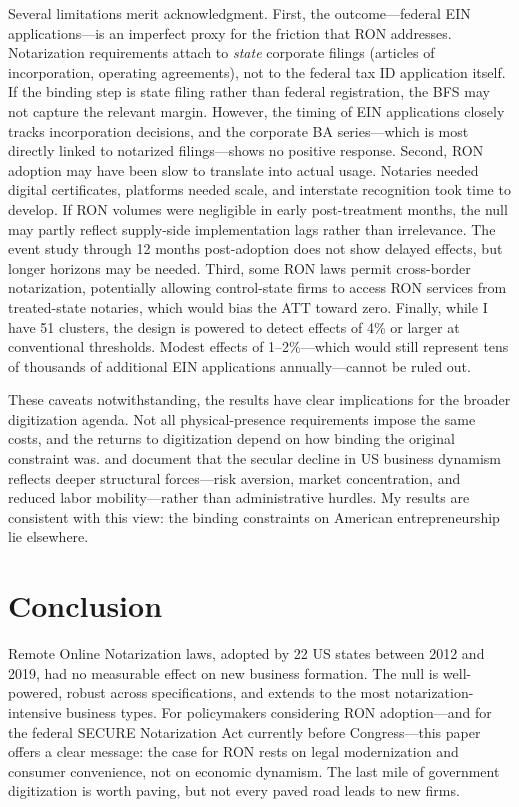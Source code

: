 \documentclass[12pt]{article}
\begin{document}
Several limitations merit acknowledgment. First, the outcome---federal EIN applications---is an imperfect proxy for the friction that RON addresses. Notarization requirements attach to \textit{state} corporate filings (articles of incorporation, operating agreements), not to the federal tax ID application itself. If the binding step is state filing rather than federal registration, the BFS may not capture the relevant margin. However, the timing of EIN applications closely tracks incorporation decisions, and the corporate BA series---which is most directly linked to notarized filings---shows no positive response. Second, RON adoption may have been slow to translate into actual usage. Notaries needed digital certificates, platforms needed scale, and interstate recognition took time to develop. If RON volumes were negligible in early post-treatment months, the null may partly reflect supply-side implementation lags rather than irrelevance. The event study through 12 months post-adoption does not show delayed effects, but longer horizons may be needed. Third, some RON laws permit cross-border notarization, potentially allowing control-state firms to access RON services from treated-state notaries, which would bias the ATT toward zero. Finally, while I have 51 clusters, the design is powered to detect effects of 4\% or larger at conventional thresholds. Modest effects of 1--2\%---which would still represent tens of thousands of additional EIN applications annually---cannot be ruled out.

These caveats notwithstanding, the results have clear implications for the broader digitization agenda. Not all physical-presence requirements impose the same costs, and the returns to digitization depend on how binding the original constraint was. \citet{haltiwanger2013} and \citet{decker2014} document that the secular decline in US business dynamism reflects deeper structural forces---risk aversion, market concentration, and reduced labor mobility---rather than administrative hurdles. My results are consistent with this view: the binding constraints on American entrepreneurship lie elsewhere.


\section{Conclusion}

Remote Online Notarization laws, adopted by 22 US states between 2012 and 2019, had no measurable effect on new business formation. The null is well-powered, robust across specifications, and extends to the most notarization-intensive business types. For policymakers considering RON adoption---and for the federal SECURE Notarization Act currently before Congress---this paper offers a clear message: the case for RON rests on legal modernization and consumer convenience, not on economic dynamism. The last mile of government digitization is worth paving, but not every paved road leads to new firms.
\end{document}

